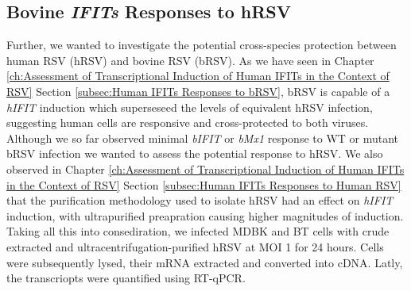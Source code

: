 \subsection{Bovine \textit{IFITs} Responses to hRSV} \label{subsec:Bovine IFITs Responses to hRSV}
Further, we wanted to investigate the potential cross-species protection between human RSV (hRSV) and bovine RSV (bRSV). As we have seen in Chapter \ref{ch:Assessment of Transcriptional Induction of Human IFITs in the Context of RSV} Section \ref{subsec:Human IFITs Responses to bRSV}, bRSV is capable of a \textit{hIFIT} induction which superseseed the levels of equivalent hRSV infection, suggesting human cells are responsive and cross-protected to both viruses. Although we so far observed minimal \textit{bIFIT} or \textit{bMx1} response to WT or mutant bRSV infection we wanted to assess the potential response to hRSV. We also observed in Chapter \ref{ch:Assessment of Transcriptional Induction of Human IFITs in the Context of RSV} Section \ref{subsec:Human IFITs Responses to Human RSV} that the purification methodology used to isolate hRSV had an effect on \textit{hIFIT} induction, with ultrapurified preapration causing higher magnitudes of induction. Taking all this into consediration, we infected MDBK and BT cells with crude extracted and ultracentrifugation-purified hRSV at MOI 1 for 24 hours. Cells were subsequently lysed, their mRNA extracted and converted into cDNA. Latly, the transcriopts were quantified using RT-qPCR.

